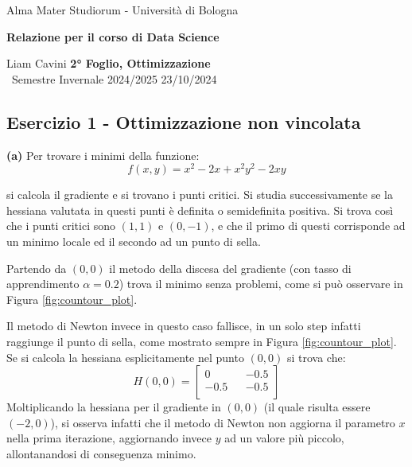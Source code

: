 \documentclass{article}
\begin{document}
\begin{center}
    {\Large Alma Mater Studiorum - Università di Bologna}
    
    \vspace{0.5cm}
    {\bf \large Relazione per il corso di Data Science}
\end{center} 

\noindent
{ Liam Cavini} \hfill {\bf 2° Foglio, Ottimizzazione}\\
{\ Semestre Invernale 2024/2025} \hfill 23/10/2024



\subsection*{Esercizio 1 - Ottimizzazione non vincolata}
\textbf{(a)} Per trovare i minimi della funzione:
\[
f(x, y) = x^2  - 2x  + x^2 y^2 - 2xy
\]

si calcola il gradiente e si trovano i punti critici. Si studia successivamente se la hessiana valutata in questi punti è definita o semidefinita positiva. Si trova così che i punti critici sono $(1,1)$ e $(0,-1)$, e che il primo di questi corrisponde ad un minimo locale ed il secondo ad un punto di sella.

Partendo da $(0,0)$ il metodo della discesa del gradiente (con tasso di apprendimento $\alpha = 0.2$) trova il minimo senza problemi, come si può osservare in Figura \ref{fig:countour_plot}.

Il metodo di Newton invece in questo caso fallisce, in un solo step infatti raggiunge il punto di sella, come mostrato sempre in Figura \ref{fig:countour_plot}. Se si calcola la hessiana esplicitamente nel punto $(0,0)$ si trova che: 
\[
H(0,0) =
\begin{bmatrix}
    0 && -0.5 \\
    -0.5 && -0.5 \\
\end{bmatrix}
\]
Moltiplicando la hessiana per il gradiente in $(0,0)$ (il quale risulta essere $(-2, 0)$), si osserva infatti che il metodo di Newton non aggiorna il parametro $x$ nella prima iterazione, aggiornando invece $y$ ad un valore più piccolo, allontanandosi di conseguenza minimo.
\end{document}
